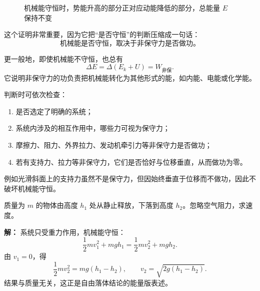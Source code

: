 \begin{figure}[htbp]
\centering
{}
\caption{机械能守恒时，势能升高的部分正对应动能降低的部分，总能量 $E$ 保持不变}
\end{figure}

这个证明非常重要，因为它把“是否守恒”的判断压缩成一句话：
\[
\boxed{\ \text{机械能是否守恒，取决于非保守力是否做功。}\ }
\]

\begin{theorem}[机械能变化定理]
更一般地，即使机械能不守恒，也总有
\[
\Delta E = \Delta(E_k+U)=W_{\text{非保}}.
\]
它说明非保守力的功负责把机械能转化为其他形式的能，如内能、电能或化学能。
\end{theorem}

\begin{remark}[判断机械能守恒的条件]
判断时可依次检查：
\begin{enumerate}
  \item 是否选定了明确的系统；
  \item 系统内涉及的相互作用中，哪些力可视为保守力；
  \item 摩擦力、阻力、外界拉力、发动机牵引力等非保守力是否做功；
  \item 若有支持力、拉力等非保守力，它们是否恰好与位移垂直，从而做功为零。
\end{enumerate}
例如光滑斜面上的支持力虽然不是保守力，但因始终垂直于位移而不做功，因此不破坏机械能守恒。
\end{remark}

\begin{example}[自由下落的机械能守恒]
质量为 $m$ 的物体由高度 $h_1$ 处从静止释放，下落到高度 $h_2$。忽略空气阻力，求速度。

\textbf{解：}
系统只受重力作用，机械能守恒：
\[
\frac{1}{2}mv_1^2+mgh_1=\frac{1}{2}mv_2^2+mgh_2.
\]
由 $v_1=0$，得
\[
\frac{1}{2}mv_2^2=mg(h_1-h_2),
\qquad
v_2=\sqrt{2g(h_1-h_2)}.
\]
结果与质量无关，这正是自由落体结论的能量版表述。
\end{example}

